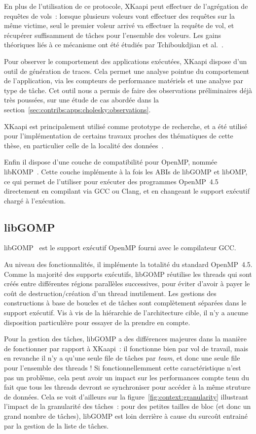En plus de l'utilisation de ce protocole, XKaapi peut effectuer de l'agrégation de requêtes de vols~: lorsque plusieurs voleurs vont effectuer des requêtes sur la même victime, seul le premier voleur arrivé va effectuer la requête de vol, et récupérer suffisamment de tâches pour l'ensemble des voleurs.
Les gains théoriques liés à ce mécanisme ont été étudiés par Tchiboukdjian et al.~\cite{Tchiboukdjian2010a}.

Pour observer le comportement des applications exécutées, XKaapi dispose d'un outil de génération de traces.
Cela permet une analyse pointue du comportement de l'application, via les compteurs de performance matériels et une analyse par type de tâche.
Cet outil nous a permis de faire des observations préliminaires déjà très poussées, sur une étude de cas abordée dans la section~\ref{sec:contribs:apps:cholesky:observations}.

XKaapi est principalement utilisé comme prototype de recherche, et a été utilisé pour l'implémentation de certains travaux proches des thématiques de cette thèse, en particulier celle de la localité des données~\cite{Durand2013, Bleuse2014, Lima2015}.

Enfin il dispose d'une couche de compatibilité pour OpenMP, nommée libKOMP~\cite{Broquedis2012}.
Cette couche implémente à la fois les ABIs de libGOMP et libOMP, ce qui permet de l'utiliser pour exécuter des programmes OpenMP~4.5 directement en compilant via GCC ou Clang, et en changeant le support exécutif chargé à l'exécution.



\subsection{libGOMP}

libGOMP~\cite{Novillo2006} est le support exécutif OpenMP fourni avec le compilateur GCC.

Au niveau des fonctionnalités, il implémente la totalité du standard OpenMP~4.5.
Comme la majorité des supports exécutifs, libGOMP réutilise les threads qui sont créés entre différentes régions parallèles successives, pour éviter d'avoir à payer le coût de destruction/création d'un thread inutilement.
Les gestions des constructions à base de boucles et de tâches sont complètement séparées dans le support exécutif.
Vis à vis de la hiérarchie de l'architecture cible, il n'y a aucune disposition particulière pour essayer de la prendre en compte.

Pour la gestion des tâches, libGOMP a des différences majeures dans la manière de fonctionner par rapport à XKaapi~: il fonctionne bien par vol de travail, mais en revanche il n'y a qu'une seule file de tâches par \emph{team}, et donc une seule file pour l'ensemble des threads !
Si fonctionnellemment cette caractéristique n'est pas un problème, cela peut avoir un impact sur les performances compte tenu du fait que tous les threads devront se synchroniser pour accéder à la même struture de données.
Cela se voit d'ailleurs sur la figure~\ref{fig:context:granularity} illustrant l'impact de la granularité des tâches~: pour des petites tailles de bloc (et donc un grand nombre de tâches), libGOMP est loin derrière à cause du surcoût entrainé par la gestion de la liste de tâches.


